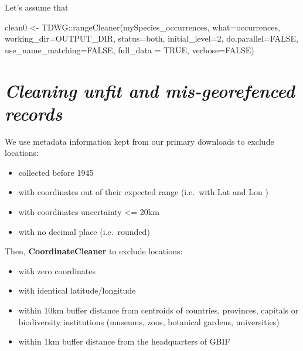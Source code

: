 \documentclass[
]{article}
\newenvironment{Shaded}{\begin{snugshade}}{\end{snugshade}}
\newcommand{\AttributeTok}[1]{\textcolor[rgb]{0.77,0.63,0.00}{#1}}
\newcommand{\ConstantTok}[1]{\textcolor[rgb]{0.00,0.00,0.00}{#1}}
\newcommand{\DecValTok}[1]{\textcolor[rgb]{0.00,0.00,0.81}{#1}}
\newcommand{\FunctionTok}[1]{\textcolor[rgb]{0.00,0.00,0.00}{#1}}
\newcommand{\NormalTok}[1]{#1}
\newcommand{\OtherTok}[1]{\textcolor[rgb]{0.56,0.35,0.01}{#1}}
\newcommand{\SpecialCharTok}[1]{\textcolor[rgb]{0.00,0.00,0.00}{#1}}
\newcommand{\StringTok}[1]{\textcolor[rgb]{0.31,0.60,0.02}{#1}}
\providecommand{\tightlist}{%
  \setlength{\itemsep}{0pt}\setlength{\parskip}{0pt}}
\begin{document}
Let's assume that

\begin{Shaded}
\begin{Highlighting}[]

\NormalTok{clean0 }\OtherTok{\textless{}{-}}\NormalTok{ TDWG}\SpecialCharTok{::}\FunctionTok{rangeCleaner}\NormalTok{(mySpecies\_occurrences,}
                   \AttributeTok{what=}\StringTok{\textquotesingle{}occurrences\textquotesingle{}}\NormalTok{,}
                   \AttributeTok{working\_dir=}\NormalTok{OUTPUT\_DIR,}
                   \AttributeTok{status=}\StringTok{\textquotesingle{}both\textquotesingle{}}\NormalTok{,}
                   \AttributeTok{initial\_level=}\DecValTok{2}\NormalTok{,}
                   \AttributeTok{do.parallel=}\ConstantTok{FALSE}\NormalTok{,}
                   \AttributeTok{use\_name\_matching=}\ConstantTok{FALSE}\NormalTok{,}
                   \AttributeTok{full\_data =} \ConstantTok{TRUE}\NormalTok{,}
                   \AttributeTok{verbose=}\ConstantTok{FALSE}\NormalTok{)}
\end{Highlighting}
\end{Shaded}

\hypertarget{cleaning-unfit-and-mis-georefenced-records}{%
\section{\texorpdfstring{\emph{Cleaning unfit and mis-georefenced
records}}{Cleaning unfit and mis-georefenced records}}\label{cleaning-unfit-and-mis-georefenced-records}}

We use metadata information kept from our primary downloads to exclude
locations:

\begin{itemize}
\tightlist
\item
  collected before 1945
\item
  with coordinates out of their expected range (i.e.~with Lat
  \notin [-90,90] and Lon \notin [-180,180])
\item
  with coordinates uncertainty \textless= 20km
\item
  with no decimal place (i.e.~rounded)
\end{itemize}

Then, \textbf{CoordinateCleaner} to exclude locations:

\begin{itemize}
\tightlist
\item
  with zero coordinates
\item
  with identical latitude/longitude
\item
  within 10km buffer distance from centroids of countries, provinces,
  capitals or biodiversity institutions (museums, zoos, botanical
  gardens, universities)
\item
  within 1km buffer distance from the headquarters of GBIF
\end{itemize}
\end{document}
